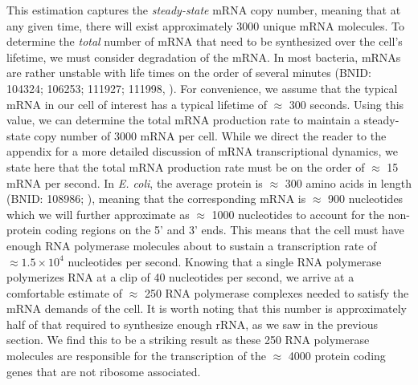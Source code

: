 This estimation captures the \textit{steady-state} mRNA copy number, meaning
that at any given time, there will exist approximately 3000 unique mRNA
molecules. To determine the \textit{total} number of mRNA that need to be
synthesized over the cell's lifetime, we must consider degradation of the mRNA.
In most bacteria, mRNAs are rather unstable with life times on the order of
several minutes (BNID: 104324; 106253; 111927; 111998, \cite{milo2010}). For
convenience, we assume that the typical mRNA in our cell of interest has a
typical lifetime of $\approx$ 300 seconds. Using this value, we can determine
the total mRNA production rate to maintain a steady-state copy number of 3000
mRNA per cell. While we direct the reader to the appendix for a more detailed
discussion of mRNA transcriptional dynamics, we state here that the total mRNA
production rate must be on the order of $\approx$ 15 mRNA per second. In
\textit{E. coli}, the average protein is $\approx$ 300 amino acids in length
(BNID: 108986; \cite{milo2010}), meaning that the corresponding mRNA is
$\approx$ 900 nucleotides which we will further approximate as $\approx$ 1000
nucleotides to account for the non-protein coding regions on the 5' and
3' ends. This means that the cell must have enough RNA polymerase molecules
about to sustain a transcription rate of $\approx 1.5 \times 10^4$ nucleotides
per second. Knowing that a single RNA polymerase polymerizes RNA at a clip of 40
nucleotides per second, we arrive at a comfortable estimate of $\approx$ 250 RNA
polymerase complexes needed to satisfy the mRNA demands of the cell. It is worth
noting that this number is approximately half of that required to synthesize
enough rRNA, as we saw in the previous section. We find this to be a striking
result as these 250 RNA polymerase molecules are responsible for the
transcription of the $\approx$ 4000 protein coding genes that are not ribosome
associated.

